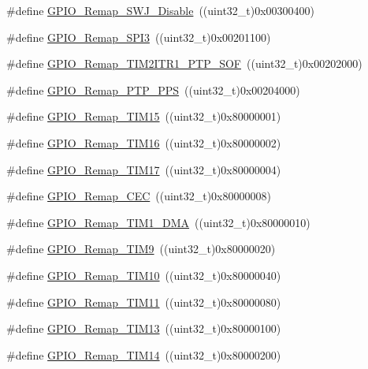 \begin{DoxyCompactItemize}
\item 
\#define \hyperlink{group__GPIO__Remap__define_gaf4832412d0ba344bb9147142cfcda828}{GPIO\_\-Remap\_\-SWJ\_\-Disable}~((uint32\_\-t)0x00300400)
\item 
\#define \hyperlink{group__GPIO__Remap__define_gac7fd74244a9d53ca02cc86bb6543a689}{GPIO\_\-Remap\_\-SPI3}~((uint32\_\-t)0x00201100)
\item 
\#define \hyperlink{group__GPIO__Remap__define_ga0dc4bec540b9372479e63295fe68ac17}{GPIO\_\-Remap\_\-TIM2ITR1\_\-PTP\_\-SOF}~((uint32\_\-t)0x00202000)
\item 
\#define \hyperlink{group__GPIO__Remap__define_ga3e9d7808d1e50393afde08e4a45d18aa}{GPIO\_\-Remap\_\-PTP\_\-PPS}~((uint32\_\-t)0x00204000)
\item 
\#define \hyperlink{group__GPIO__Remap__define_gaead5c447875e8b384945424845452b82}{GPIO\_\-Remap\_\-TIM15}~((uint32\_\-t)0x80000001)
\item 
\#define \hyperlink{group__GPIO__Remap__define_gac9d612f9f9f9f66faecbdbbc29d2ac61}{GPIO\_\-Remap\_\-TIM16}~((uint32\_\-t)0x80000002)
\item 
\#define \hyperlink{group__GPIO__Remap__define_ga9fe98e01f8837d6a1ac4b4833f0fc45e}{GPIO\_\-Remap\_\-TIM17}~((uint32\_\-t)0x80000004)
\item 
\#define \hyperlink{group__GPIO__Remap__define_gac5961690908d4a0737e82b5a7d271b9b}{GPIO\_\-Remap\_\-CEC}~((uint32\_\-t)0x80000008)
\item 
\#define \hyperlink{group__GPIO__Remap__define_ga255adf908d7d530267707fee39ba2026}{GPIO\_\-Remap\_\-TIM1\_\-DMA}~((uint32\_\-t)0x80000010)
\item 
\#define \hyperlink{group__GPIO__Remap__define_gadfed4d88bc9a4093d16ce64a85b6051a}{GPIO\_\-Remap\_\-TIM9}~((uint32\_\-t)0x80000020)
\item 
\#define \hyperlink{group__GPIO__Remap__define_gac94252266a8fcb9ce7b55b5c55464110}{GPIO\_\-Remap\_\-TIM10}~((uint32\_\-t)0x80000040)
\item 
\#define \hyperlink{group__GPIO__Remap__define_ga0f308f1bb45e4c473766603b4bef47f8}{GPIO\_\-Remap\_\-TIM11}~((uint32\_\-t)0x80000080)
\item 
\#define \hyperlink{group__GPIO__Remap__define_ga72f5da86ed94f3be978cd841f7cd37cb}{GPIO\_\-Remap\_\-TIM13}~((uint32\_\-t)0x80000100)
\item 
\#define \hyperlink{group__GPIO__Remap__define_gaa2ae554ed69ad3368c2cd7db678b3fd0}{GPIO\_\-Remap\_\-TIM14}~((uint32\_\-t)0x80000200)
\item 

\end{DoxyCompactItemize}
